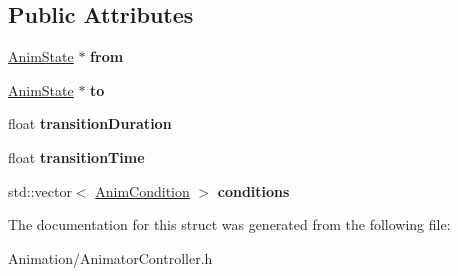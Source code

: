 \subsection*{Public Attributes}
\begin{DoxyCompactItemize}
\item 
\mbox{\label{structAnimTransition_a3a3a68577c477a031437d5f246141db7}} 
\hyperlink{structAnimState}{Anim\+State} $\ast$ {\bfseries from}
\item 
\mbox{\label{structAnimTransition_a73bd8f29355ac7b233647d296d9a061e}} 
\hyperlink{structAnimState}{Anim\+State} $\ast$ {\bfseries to}
\item 
\mbox{\label{structAnimTransition_acd901f21fdabd3da04664b909b50b7de}} 
float {\bfseries transition\+Duration}
\item 
\mbox{\label{structAnimTransition_aee7a43acbecd5bb1220a1c478af2732d}} 
float {\bfseries transition\+Time}
\item 
\mbox{\label{structAnimTransition_af3fa828e2da65031824d064e33d1c522}} 
std\+::vector$<$ \hyperlink{structAnimCondition}{Anim\+Condition} $>$ {\bfseries conditions}
\end{DoxyCompactItemize}


The documentation for this struct was generated from the following file\+:\begin{DoxyCompactItemize}
\item 
Animation/Animator\+Controller.\+h\end{DoxyCompactItemize}
